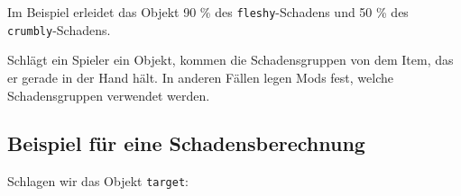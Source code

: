 \begin{Shaded}
\begin{Highlighting}[]
\OperatorTok{:}\OperatorTok{(\{}
     \OperatorTok{=} \OperatorTok{,}
     \OperatorTok{=} \OperatorTok{,}
\OperatorTok{\})}
\end{Highlighting}
\end{Shaded}

Im Beispiel erleidet das Objekt 90 \% des \texttt{fleshy}-Schadens und
50 \% des \texttt{crumbly}-Schadens.

Schlägt ein Spieler ein Objekt, kommen die Schadensgruppen von dem Item,
das er gerade in der Hand hält. In anderen Fällen legen Mods fest,
welche Schadensgruppen verwendet werden.

\subsection{Beispiel für eine
Schadensberechnung}\label{beispiel-fuxfcr-eine-schadensberechnung}

Schlagen wir das Objekt \texttt{target}:

\begin{Shaded}
\begin{Highlighting}[]
  \OperatorTok{=} \OperatorTok{\{}
     \OperatorTok{=} \OperatorTok{,}
     \OperatorTok{=} \OperatorTok{\{}  \OperatorTok{=} \OperatorTok{,}  \OperatorTok{=}  \OperatorTok{\},}

     \OperatorTok{=} \OperatorTok{,}
     \OperatorTok{=} \OperatorTok{\{}
         \OperatorTok{=} \OperatorTok{\{}
             \OperatorTok{=} \OperatorTok{\{} \OperatorTok{[}\OperatorTok{]} \OperatorTok{=} \OperatorTok{,} \OperatorTok{[}\OperatorTok{]} \OperatorTok{=} \OperatorTok{,} \OperatorTok{[}\OperatorTok{]} \OperatorTok{=}  \OperatorTok{\},}
             \OperatorTok{=} \OperatorTok{,}
             \OperatorTok{=} \OperatorTok{,}
        \OperatorTok{\},}
    \OperatorTok{\},}
\OperatorTok{\}}

  \OperatorTok{=}
\OperatorTok{:}\OperatorTok{(}
    \OperatorTok{,}
    \OperatorTok{,}
\OperatorTok{)}
\end{Highlighting}
\end{Shaded}

